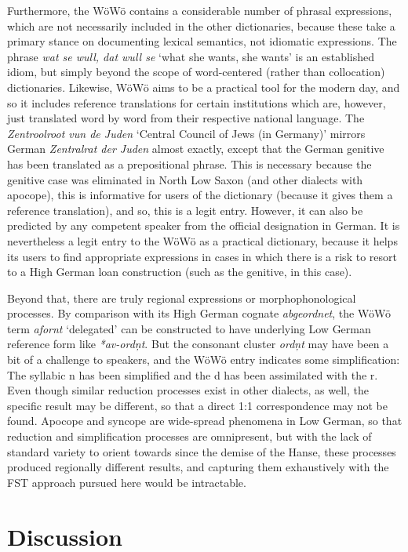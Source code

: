 \documentclass{article}
\newcommand{\word}[1]{\textsl{#1}}
\begin{document}
Furthermore, the WöWö contains a considerable number of phrasal expressions, which are not necessarily included in the other dictionaries, because these take a primary stance on documenting lexical semantics, not idiomatic expressions. The phrase \word{wat se wull, dat wull se} `what she wants, she wants' is an established idiom, but simply beyond the scope of word-centered (rather than collocation) dictionaries. Likewise, WöWö aims to be a practical tool for the modern day, and so it includes reference translations for certain institutions which are, however, just translated word by word from their respective national language. The \word{Zentroolroot vun de Juden} `Central Council of Jews (in Germany)' mirrors German \word{Zentralrat der Juden} almost exactly, except that the German genitive has been translated as a prepositional phrase. This is necessary because the genitive case was eliminated in North Low Saxon (and other dialects with apocope), this is informative for users of the dictionary (because it gives them a reference translation), and so, this is a legit entry. However, it can also be predicted by any competent speaker from the official designation in German. It is nevertheless a legit entry to the WöWö as a practical dictionary, because it helps its users to find appropriate expressions in cases in which there is a risk to resort to a High German loan construction (such as the genitive, in this case).

Beyond that, there are truly regional expressions or morphophonological processes. By comparison with its High German cognate \word{abgeordnet}, the WöWö term \word{afornt} `delegated' can be constructed to have underlying Low German reference form like \word{*av-ordņt}. But the consonant cluster \word{ordņt} may have been a bit of a challenge to speakers, and the WöWö entry indicates some simplification: The syllabic n has been simplified and the d has been assimilated with the r. Even though similar reduction processes exist in other dialects, as well, the specific result may be different, so that a direct 1:1 correspondence may not be found. Apocope and syncope are wide-spread phenomena in Low German, so that reduction and simplification processes are omnipresent, but with the lack of standard variety to orient towards since the demise of the Hanse, these processes produced regionally different results, and capturing them exhaustively with the FST approach pursued here would be intractable.




\section{Discussion}
\end{document}
